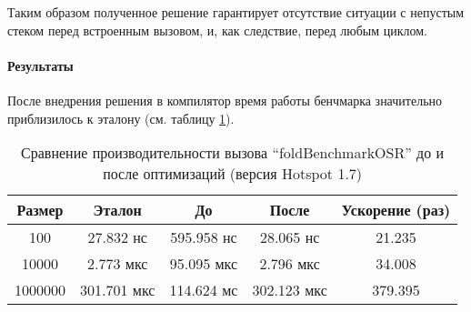 Таким образом полученное решение гарантирует отсутствие ситуации с непустым стеком перед встроенным
вызовом, и, как следствие, перед любым циклом.

\paragraph{Результаты}
После внедрения решения в компилятор время работы бенчмарка значительно приблизилось к эталону
(см. таблицу \ref{bm:foldOSR:opt}).

\begin{table}[h]
\begin{center}
\begin{tabular}{|c|c|c|c|c|} \hline
Размер & Эталон & До & После & Ускорение (раз) \\ \hline
100 & 27.832 нс & 595.958 нс & 28.065 нс & 21.235\\ \hline
10000 & 2.773 мкс & 95.095 мкс & 2.796 мкс & 34.008\\ \hline
1000000 & 301.701 мкс & 114.624 мс & 302.123 мкс & 379.395\\ \hline
\end{tabular}
\caption{Сравнение производительности вызова ``foldBenchmarkOSR'' до и после оптимизаций (версия Hotspot 1.7)}
\label{bm:foldOSR:opt}
\end{center}
\end{table}
